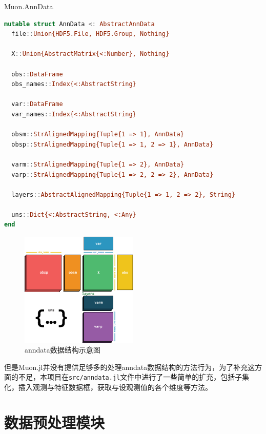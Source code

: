 \begin{fancybox}{Muon.AnnData}
\begin{lstlisting}[language=julia]
mutable struct AnnData <: AbstractAnnData
  file::Union{HDF5.File, HDF5.Group, Nothing}

  X::Union{AbstractMatrix{<:Number}, Nothing}

  obs::DataFrame
  obs_names::Index{<:AbstractString}

  var::DataFrame
  var_names::Index{<:AbstractString}

  obsm::StrAlignedMapping{Tuple{1 => 1}, AnnData}
  obsp::StrAlignedMapping{Tuple{1 => 1, 2 => 1}, AnnData}

  varm::StrAlignedMapping{Tuple{1 => 2}, AnnData}
  varp::StrAlignedMapping{Tuple{1 => 2, 2 => 2}, AnnData}

  layers::AbstractAlignedMapping{Tuple{1 => 1, 2 => 2}, String}

  uns::Dict{<:AbstractString, <:Any}
end
\end{lstlisting}
\end{fancybox}

\begin{figure}[htbp]
  \centering
  \includegraphics[width=0.5\textwidth]{img/anndata_schema.pdf}
  \caption{anndata数据结构示意图}
  \label{img:anndata}
\end{figure}


但是Muon.jl并没有提供足够多的处理anndata数据结构的方法行为，为了补充这方面的不足，本项目在\lstinline|src/anndata.jl|文件中进行了一些简单的扩充，包括子集化，插入观测与特征数据框，获取与设观测值的各个维度等方法。

\section{数据预处理模块}

